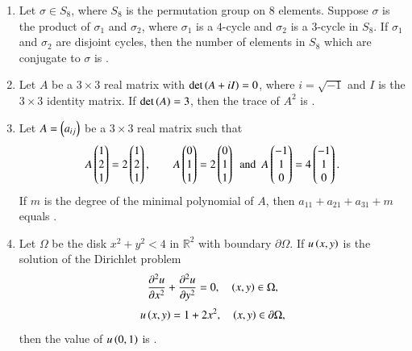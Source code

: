 \documentclass[journal,12pt,onecolumn]{IEEEtran}
\theoremstyle{remark}
\begin{document}
\begin{enumerate}[start=1, label=Q.\arabic*]
\hfill{}


\item Let $\sigma\in S_{8}$, where $S_{8}$ is the permutation group on $8$ elements. Suppose $\sigma$ is the product of $\sigma_{1}$ and $\sigma_{2}$, where $\sigma_{1}$ is a $4$\mbox{-}cycle and $\sigma_{2}$ is a $3$\mbox{-}cycle in $S_{8}$. If $\sigma_{1}$ and $\sigma_{2}$ are disjoint cycles, then the number of elements in $S_{8}$ which are conjugate to $\sigma$ is \underline{\hspace{2cm}}.

\hfill{}
\item Let $A$ be a $3\times 3$ real matrix with $\det\left(A+iI\right)=0$, where $i=\sqrt{-1}$ and $I$ is the $3\times 3$ identity matrix. If $\det\left(A\right)=3$, then the trace of $A^{2}$ is \underline{\hspace{2cm}}.

\hfill{}

\item Let $A=\left(a_{ij}\right)$ be a $3\times 3$ real matrix such that
\[
A\myvec{1\\2\\1}=2\myvec{1\\2\\1},\qquad
A\myvec{0\\1\\1}=2\myvec{0\\1\\1}\ \text{ and }\ 
A\myvec{-1\\1\\0}=4\myvec{-1\\1\\0}.
\]
If $m$ is the degree of the minimal polynomial of $A$, then $a_{11}+a_{21}+a_{31}+m$ equals \underline{\hspace{2cm}}.

\hfill{}

\item Let $\Omega$ be the disk $x^{2}+y^{2}<4$ in $\mathbb{R}^{2}$ with boundary $\partial\Omega$. If $u\left(x,y\right)$ is the solution of the Dirichlet problem
\[
\frac{\partial^{2}u}{\partial x^{2}}+\frac{\partial^{2}u}{\partial y^{2}}=0,\quad \left(x,y\right)\in \Omega,
\]
\[
u\left(x,y\right)=1+2x^{2},\quad \left(x,y\right)\in \partial\Omega,
\]
then the value of $u\left(0,1\right)$ is \underline{\hspace{2cm}}.

\hfill{}



\end{enumerate}
\end{document}
